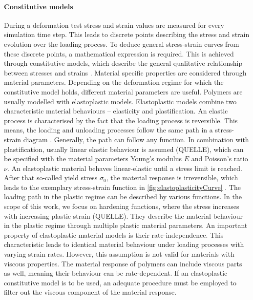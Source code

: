 \paragraph{Constitutive models}
During a deformation test stress and strain values are measured for every simulation time step. This leads to discrete points describing the stress and strain evolution over the loading process. To deduce general stress-strain curves from these discrete points, a mathematical expression is required. This is achieved through constitutive models, which describe the general qualitative relationship between stresses and strains \cite{mergheim_lecture_nodate}. Material specific properties are considered through material parameters.
Depending on the deformation regime for which the constitutive model holds, different material parameters are useful. Polymers are usually modelled with elastoplastic models. Elastoplastic models combine two characteristic material behaviours – elasticity and plastification. An elastic process is characterised by the fact that the loading process is reversible. This means, the loading and unloading processes follow the same path in a stress-strain diagram \cite{mergheim_lecture_nodate}. Generally, the path can follow any function. In combination with plastification, usually linear elastic behaviour is assumed (QUELLE), which can be specified with the material parameters Young's modulus $E$ and Poisson's ratio $\nu$. An elastoplastic material behaves linear-elastic until a stress limit is reached. After that so-called yield stress $\sigma_0$, the material response is irreversible, which leads to the exemplary stress-strain function in \autoref{fig:elastoplasticityCurve} \cite{mergheim_lecture_nodate}. The loading path in the plastic regime can be described by various functions. In the scope of this work, we focus on hardening functions, where the stress increases with increasing plastic strain (QUELLE). They describe the material behaviour in the plastic regime through multiple plastic material parameters. An important property of elastoplastic material models is their rate-independence. This characteristic leads to identical material behaviour under loading processes with varying strain rates. However, this assumption is not valid for materials with viscous properties. The material response of polymers can include viscous parts as well, meaning their behaviour can be rate-dependent. If an elastoplastic constitutive model is to be used, an adequate procedure must be employed to filter out the viscous component of the material response. 


